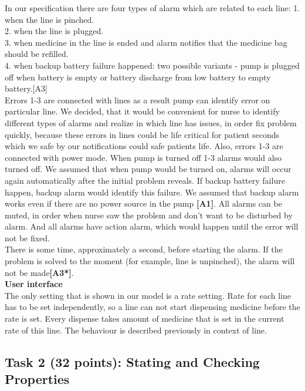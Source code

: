 \documentclass{article}
\newcommand{\head}{\subsection*}
\begin{document}
In our specification there are four types of alarm which are related to each line: 
1. when the line is pinched.\\
2. when the line is plugged.\\
3. when medicine in the line is ended and alarm notifies that the medicine bag should be refilled.\\
4. when backup battery failure happened: two possible variants - pump is plugged off when battery is empty or battery discharge from low battery to empty battery.[A3]\\
 Errors 1-3 are connected with lines as a result pump can identify error on particular line. We decided, that it would be convenient for nurse to identify different types of alarms and realize in which line has issues, in order fix problem quickly, because these errors in lines could be life critical for patient seconds which we safe by our notifications could safe patients life. Also, errors 1-3 are connected with power mode. When pump is turned off 1-3 alarms would also turned off. We assumed that when pump would be turned on, alarms will occur again automatically after the initial problem reveals. If backup battery failure happen, backup alarm would identify this failure. We assumed that backup alarm works even if there are no power source in the pump \textbf{[A1]}.
All alarms can be muted, in order when nurse saw the problem and don't want to be disturbed by alarm. And all alarms have action alarm, which would happen until the error will not be fixed.\\
There is some time, approximately a second, before starting the alarm. If the problem is solved to the moment (for example, line is unpinched), the alarm will not be made\textbf{[A3*]}.\\

\textbf{User interface} \\

The only setting that is shown in our model is a rate setting. Rate for each line has to be set independently, so a line can not start dispensing medicine before the rate is set. Every dispense takes amount of medicine that is set in the current rate of this line. The behaviour is described previously in context of line.




\head{Task 2 (32 points): Stating and Checking Properties}
\end{document}

